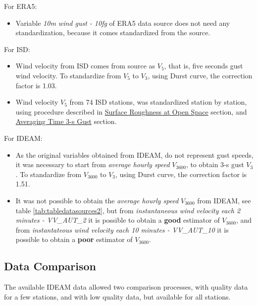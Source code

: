 \documentclass[12pt,oneside]{reedthesis}
\providecommand{\tightlist}{%
  \setlength{\itemsep}{0pt}\setlength{\parskip}{0pt}}
\begin{document}
For ERA5:
\begin{itemize}
\tightlist
\item
  Variable \emph{10m wind gust - 10fg} of ERA5 data source does not need any standardization, because it comes standardized from the source.
\end{itemize}
For ISD:
\begin{itemize}
\item
  Wind velocity from ISD comes from source as \(V_5\), that is, five seconds gust wind velocity. To standardize from \(V_5\) to \(V_3\), using Durst curve, the correction factor is 1.03.
\item
  Wind velocity \(V_5\) from 74 ISD stations, was standardized station by station, using procedure described in \protect\hyperlink{rmd-roughness}{Surface Roughness at Open Space} section, and \protect\hyperlink{rmd-gust}{Averaging Time 3-s Gust} section.
\end{itemize}
For IDEAM:
\begin{itemize}
\item
  As the original variables obtained from IDEAM, do not represent gust speeds, it was necessary to start from \emph{average hourly speed} \(V_{3600}\), to obtain 3-s gust \(V_3\). To standardize from \(V_{3600}\) to \(V_3\), using Durst curve, the correction factor is 1.51.
\item
  It was not possible to obtain the \emph{average hourly speed} \(V_{3600}\) from IDEAM, see table \ref{tab:tabledatasources2}, but from \emph{instantaneous wind velocity each 2 minutes - VV\_AUT\_2} it is possible to obtain a \textbf{good} estimator of \(V_{3600}\), and from \emph{instantateous wind velocity each 10 minutes - VV\_AUT\_10} it is possible to obtain a \textbf{poor} estimator of \(V_{3600}\).
\end{itemize}
\hypertarget{data-comparison}{%
\subsection{Data Comparison}\label{data-comparison}}

The available IDEAM data allowed two comparison processes, with quality data for a few stations, and with low quality data, but available for all stations.
\end{document}
